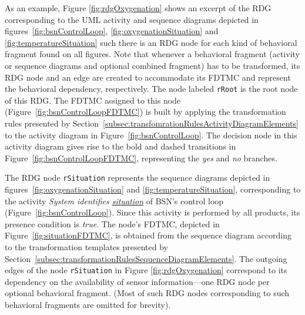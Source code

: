 As an example, Figure \ref{fig:rdgOxygenation} shows an excerpt of the RDG
corresponding to the UML activity and sequence diagrams depicted in
figures~\ref{fig:bsnControlLoop}, \ref{fig:oxygenationSituation} and
\ref{fig:temperatureSituation} such there is an RDG node for each kind of
behavioral fragment  found on all figures. Note that whenever a behavioral
fragment (activity or sequence diagrams and optional combined fragment) has to
be transformed, its RDG node and an edge are created to accommodate its FDTMC
and represent the behavioral dependency, respectively.  The node labeled
\texttt{rRoot} is the root node of this RDG.  The FDTMC assigned to this node
(Figure~\ref{fig:bsnControlLoopFDTMC}) is built by applying the transformation
rules presented by Section~\ref{subsec:transfomrationRulesActivityDiagramElements}  to the activity diagram in
Figure~\ref{fig:bsnControlLoop}.  The decision node in this activity diagram
gives rise to the bold and dashed transitions in
Figure~\ref{fig:bsnControlLoopFDTMC}, representing the \textit{yes} and
\textit{no} branches.


The RDG node \texttt{rSituation} represents the sequence diagrams depicted in
figures~\ref{fig:oxygenationSituation} and \ref{fig:temperatureSituation},
corresponding to the activity \emph{System identifies \underline{situation}} of
BSN's control loop (Figure~\ref{fig:bsnControlLoop}).  Since this activity is
performed by all products, its presence condition is \textit{true}.  The node's
FDTMC, depicted in Figure~\ref{fig:situationFDTMC}, is obtained from the
sequence diagram according to the transformation templates presented by Section~\ref{subsec:transformationRulesSequenceDiagramElements}.  The outgoing edges of the node
\texttt{rSituation} in Figure \ref{fig:rdgOxygenation} correspond to its
dependency on the availability of sensor information---one RDG node per
optional behavioral fragment.  (Most of such RDG nodes corresponding to such
behavioral fragments are omitted for brevity).

